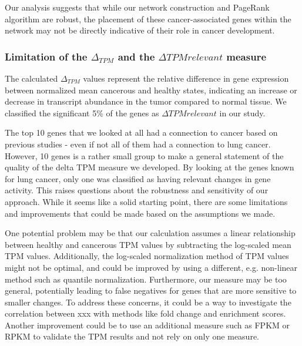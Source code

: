 Our analysis suggests that while our network construction and PageRank algorithm are robust,
the placement of these cancer-associated genes within the network may not be directly indicative
of their role in cancer development.\\

\subsubsection*{Limitation of the $\Delta_{TPM}$ and the $\Delta TPM relevant$ measure} \label{subsubsec:limit_delta_tpm}
The calculated $\Delta_{TPM}$ values represent the relative difference in gene expression between normalized mean cancerous and healthy states,
indicating an increase or decrease in transcript abundance in the tumor compared to normal tissue.
We classified the significant 5\% of the genes as $\Delta TPM relevant$ in our study.

The top 10 genes that we looked at all had a connection to cancer based on previous studies
- even if not all of them had a connection to lung cancer.
However, 10 genes is a rather small group to make a general statement of the quality of the delta TPM measure we developed.
By looking at the genes known for lung cancer, only one was classified as having relevant changes in gene activity.
This raises questions about the robustness and sensitivity of our approach.
While it seems like a solid starting point, there are some limitations and improvements that could be made based on the assumptions we made.

One potential problem may be that our calculation assumes a linear relationship between healthy and cancerous TPM values
by subtracting the log-scaled mean TPM values.
Additionally, the log-scaled normalization method of TPM values might not be optimal,
and could be improved by using a different, e.g. non-linear method such as quantile normalization.
Furthermore, our measure may be too general, potentially leading to false negatives for genes that are more sensitive to smaller changes.
To address these concerns, it could be a way to investigate the correlation between xxx with methods like fold change and enrichment scores.
Another improvement could be to use an additional measure such as FPKM or RPKM to validate the TPM results and not rely on only one measure.
\\

